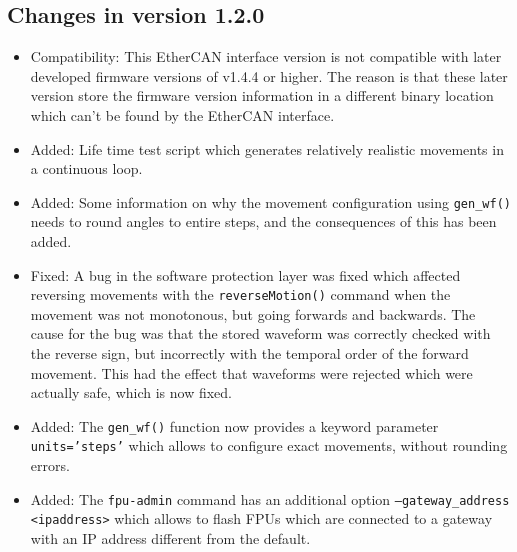 \documentclass[11pt,a4paper]{report}
\begin{document}
\subsection*{Changes in version 1.2.0}
\begin{itemize}
\item Compatibility: This EtherCAN interface version is not compatible with later
  developed firmware versions of v1.4.4 or higher. The reason is that
  these later version store the firmware version information in a
  different binary location which can't be found by the EtherCAN interface.
  
\item Added: Life time test script which generates relatively
  realistic movements in a continuous loop.
  
\item Added: Some information on why the movement configuration using
  \texttt{gen\_wf()} needs to round angles to entire steps, and the
  consequences of this has been added.

\item Fixed: A bug in the software protection layer was fixed which
  affected reversing movements with the \texttt{reverseMotion()}
  command when the movement was not monotonous, but going forwards and
  backwards. The cause for the bug was that the stored waveform was
  correctly checked with the reverse sign, but incorrectly with the
  temporal order of the forward movement. This had the effect that
  waveforms were rejected which were actually safe, which is now
  fixed.
    
\item Added: The \texttt{gen\_wf()} function now provides a keyword
  parameter \texttt{units='steps'} which allows to configure exact
  movements, without rounding errors.

\item Added: The \texttt{fpu-admin} command has an additional option
  \texttt{--gateway\_address <ipaddress>} which allows to flash
  FPUs which are connected to a gateway with an IP address different
  from the default.
  

\end{itemize}
\end{document}
